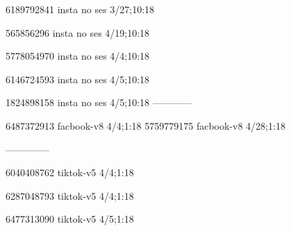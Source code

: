 6189792841 insta no ses
3/27;10:18

565856296 insta no ses
4/19;10:18

5778054970 insta no ses
4/4;10:18

6146724593 insta no ses
4/5;10:18

1824898158 insta no ses
4/5;10:18
------------

6487372913 facbook-v8
4/4;1:18
5759779175 facbook-v8
4/28;1:18


--------------

6040408762 tiktok-v5
4/4;1:18

6287048793 tiktok-v5
4/4;1:18

6477313090 tiktok-v5
4/5;1:18
